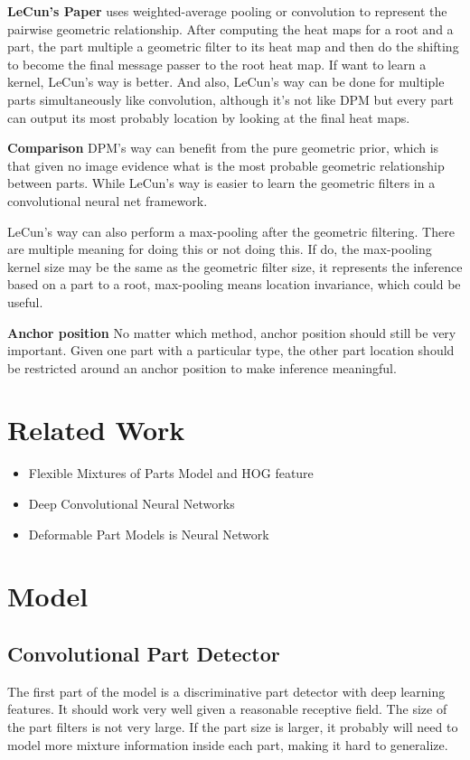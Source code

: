 \documentclass[10pt,twocolumn,letterpaper]{article}
\begin{document}
{\bf LeCun's Paper} uses weighted-average pooling or convolution to represent the pairwise geometric relationship. After computing the heat maps for a root and a part, the part multiple a geometric filter to its heat map and then do the shifting to become the final message passer to the root heat map. If want to learn a kernel, LeCun's way is better. And also, LeCun's way can be done for multiple parts simultaneously like convolution, although it's not like DPM but every part can output its most probably location by looking at the final heat maps. 

{\bf Comparison} DPM's way can benefit from the pure geometric prior, which is that given no image evidence what is the most probable geometric relationship between parts. While LeCun's way is easier to learn the geometric filters in a convolutional neural net framework.

LeCun's way can also perform a max-pooling after the geometric filtering. There are multiple meaning for doing this or not doing this. If do, the max-pooling kernel size may be the same as the geometric filter size, it represents the inference based on a part to a root, max-pooling means location invariance, which could be useful.

{\bf Anchor position} No matter which method, anchor position should still be very important. Given one part with a particular type, the other part location should be restricted around an anchor position to make inference meaningful.

\section{Related Work}
\begin{itemize}
  \item Flexible Mixtures of Parts Model and HOG feature
  \item Deep Convolutional Neural Networks
  \item Deformable Part Models is Neural Network
\end{itemize}

\section{Model} 

\subsection{Convolutional Part Detector}
The first part of the model is a discriminative part detector with deep learning features. It should work very well given a reasonable receptive field. The size of the part filters is not very large. If the part size is larger, it probably will need to model more mixture information inside each part, making it hard to generalize.
\end{document}
